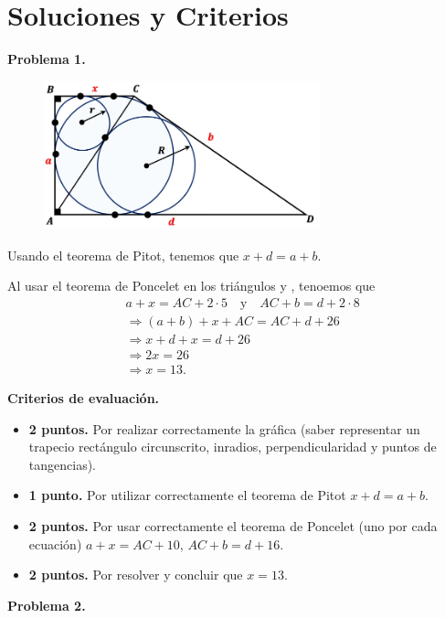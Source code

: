 \newpage
\section*{\large Soluciones y Criterios}

\textbf{Problema 1.}

\begin{figure}[htb]
    \centering
    \includegraphics[width=8cm]{images/problem-1}
\end{figure}

Usando el teorema de Pitot, tenemos que $x + d = a + b$.

Al usar el teorema de Poncelet en los triángulos  y , tenoemos que
\begin{align*}
    &a + x = AC +  2 \cdot 5 \quad \text{y} \quad AC + b = d + 2\cdot 8\\[3mm]
    &\Rightarrow (a + b) + x + AC = AC + d + 26\\
    &\Rightarrow x + d + x = d + 26\\
    &\Rightarrow 2x = 26\\
    &\Rightarrow \boxed{x = 13}.
\end{align*}

\textbf{Criterios de evaluación.}
\begin{itemize}
    \item \textbf{2 puntos.} Por realizar correctamente la gráfica (saber representar un trapecio rectángulo circunscrito, inradios, perpendicularidad y puntos de tangencias).
    \item \textbf{1 punto.} Por utilizar correctamente el teorema de Pitot $x + d = a + b$.
    \item \textbf{2 puntos.} Por usar correctamente el teorema de Poncelet (uno por cada ecuación) $a + x = AC + 10$, $AC + b = d + 16$.
    \item \textbf{2 puntos.} Por resolver y concluir que $x = 13$.
\end{itemize}



\newpage
\textbf{Problema 2.}

